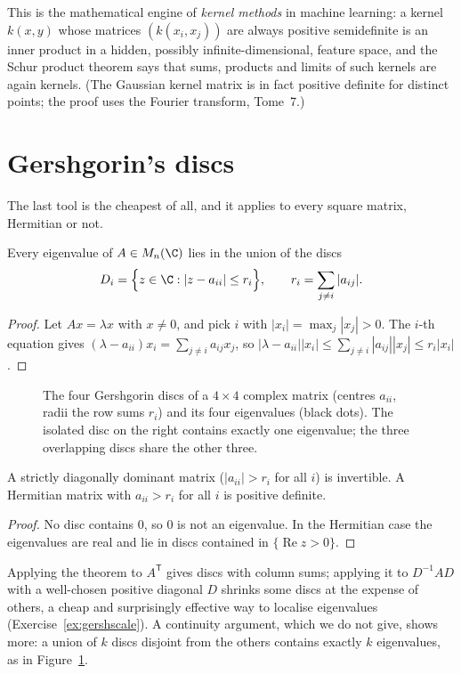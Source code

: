 This is the mathematical engine of \emph{kernel methods} in machine learning: a kernel $k(x,y)$ whose matrices $(k(x_i,x_j))$ are
always positive semidefinite is an inner product in a hidden, possibly infinite-dimensional, feature space, and the Schur product
theorem says that sums, products and limits of such kernels are again kernels. (The Gaussian kernel matrix is in fact positive
definite for distinct points; the proof uses the Fourier transform, Tome~7.)

\section{Gershgorin's discs}

The last tool is the cheapest of all, and it applies to every square matrix, Hermitian or not.

\begin{theorem}[Gershgorin, 1931]\label{thm:gershgorin}
Every eigenvalue of $A\in M_n(\C)$ lies in the union of the discs
\[
D_i=\Bigl\{z\in\C:|z-a_{ii}|\le r_i\Bigr\},\qquad r_i=\sum_{j\ne i}|a_{ij}|.
\]
\end{theorem}
\begin{proof}
Let $Ax=\lambda x$ with $x\ne0$, and pick $i$ with $|x_i|=\max_j|x_j|>0$. The $i$-th equation gives $(\lambda-a_{ii})x_i=\sum_{j\ne
i}a_{ij}x_j$, so $|\lambda-a_{ii}||x_i|\le\sum_{j\ne i}|a_{ij}||x_j|\le r_i|x_i|$.
\end{proof}

\begin{figure}[ht]
\centering
{}
\caption{The four Gershgorin discs of a $4\times4$ complex matrix (centres $a_{ii}$, radii the row sums $r_i$) and its four eigenvalues
(black dots). The isolated disc on the right contains exactly one eigenvalue; the three overlapping discs share the other three.}
\label{fig:gershgorin}
\end{figure}

\begin{corollary}\label{cor:diagdom}
A strictly diagonally dominant matrix ($|a_{ii}|>r_i$ for all $i$) is invertible. A Hermitian matrix with $a_{ii}>r_i$ for all $i$ is
positive definite.
\end{corollary}
\begin{proof}
No disc contains $0$, so $0$ is not an eigenvalue. In the Hermitian case the eigenvalues are real and lie in discs contained in
$\{\operatorname{Re}z>0\}$.
\end{proof}

Applying the theorem to $A^{\mathsf T}$ gives discs with column sums; applying it to $D^{-1}AD$ with a well-chosen positive diagonal $D$
shrinks some discs at the expense of others, a cheap and surprisingly effective way to localise eigenvalues (Exercise~\ref{ex:gershscale}).
A continuity argument, which we do not give, shows more: a union of $k$ discs disjoint from the others contains exactly $k$ eigenvalues,
as in Figure~\ref{fig:gershgorin}.

